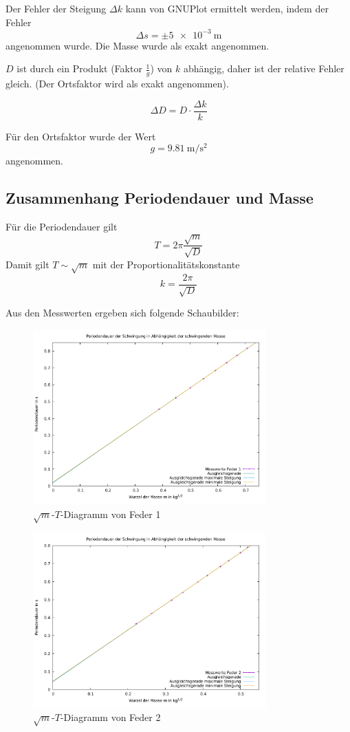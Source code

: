 Der Fehler der Steigung $\Delta k$ kann von GNUPlot ermittelt werden, indem der Fehler
$$\Delta s = \pm \SI{5e-3}{\meter}$$
angenommen wurde. Die Masse wurde als exakt angenommen.

$D$ ist durch ein Produkt (Faktor $\frac{1}{g}$) von $k$ abhängig, daher ist der relative Fehler gleich. (Der Ortsfaktor wird als exakt angenommen).

$$\Delta D = D \cdot \frac{\Delta k}{k}$$

Für den Ortsfaktor wurde der Wert
$$g = \SI{9.81}{\meter\per\square\second}$$
angenommen.

\subsection{Zusammenhang Periodendauer und Masse}
Für die Periodendauer gilt
$$T = 2\pi \frac{\sqrt{m}}{\sqrt{D}}$$
Damit gilt $T \sim \sqrt{m}$ mit der Proportionalitätskonstante
$$k = \frac{2\pi}{\sqrt{D}}$$

Aus den Messwerten ergeben sich folgende Schaubilder:

\begin{figure}[H]
\centering
\includegraphics[width=0.8\textwidth]{data/spring1.pdf}
\caption{$\sqrt{m}$-$T$-Diagramm von Feder 1}
\end{figure}
\begin{figure}[H]
\centering
\includegraphics[width=0.8\textwidth]{data/spring2.pdf}
\caption{$\sqrt{m}$-$T$-Diagramm von Feder 2}
\end{figure}


